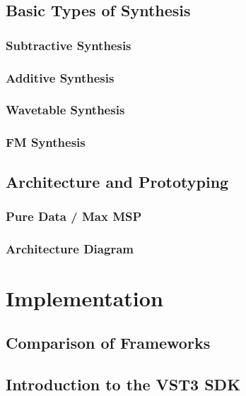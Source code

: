 \documentclass[12pt]{article}
\begin{document}
\subsection{Basic Types of Synthesis}

\subsubsection{Subtractive Synthesis}

\subsubsection{Additive Synthesis}

\subsubsection{Wavetable Synthesis}

\subsubsection{FM Synthesis}

\subsection{Architecture and Prototyping}

\subsubsection{Pure Data / Max MSP}

\subsubsection{Architecture Diagram}

\section{Implementation}

\subsection{Comparison of Frameworks}

\subsection{Introduction to the VST3 SDK}
\end{document}
